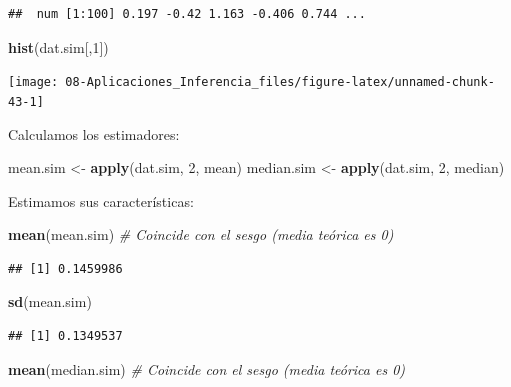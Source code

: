 \documentclass[
]{book}
\newenvironment{Shaded}{\begin{snugshade}}{\end{snugshade}}
\newcommand{\CommentTok}[1]{\textcolor[rgb]{0.56,0.35,0.01}{\textit{#1}}}
\newcommand{\DecValTok}[1]{\textcolor[rgb]{0.00,0.00,0.81}{#1}}
\newcommand{\KeywordTok}[1]{\textcolor[rgb]{0.13,0.29,0.53}{\textbf{#1}}}
\newcommand{\NormalTok}[1]{#1}
\newcommand{\StringTok}[1]{\textcolor[rgb]{0.31,0.60,0.02}{#1}}
\theoremstyle{break}
\theoremstyle{definition}
\theoremstyle{definition}
\theoremstyle{definition}
\theoremstyle{remark}
\begin{document}
\begin{enumerate}
\begin{verbatim}
##  num [1:100] 0.197 -0.42 1.163 -0.406 0.744 ...
\end{verbatim}

\begin{Shaded}
\begin{Highlighting}[]
\KeywordTok{hist}\NormalTok{(dat.sim[,}\DecValTok{1}\NormalTok{])}
\end{Highlighting}
\end{Shaded}

  \begin{center}\texttt{[image: 08-Aplicaciones\_Inferencia\_files/figure-latex/unnamed-chunk-43-1]} \end{center}

  Calculamos los estimadores:

\begin{Shaded}
\begin{Highlighting}[]
\NormalTok{mean.sim <-}\StringTok{ }\KeywordTok{apply}\NormalTok{(dat.sim, }\DecValTok{2}\NormalTok{, mean)}
\NormalTok{median.sim <-}\StringTok{ }\KeywordTok{apply}\NormalTok{(dat.sim, }\DecValTok{2}\NormalTok{, median)}
\end{Highlighting}
\end{Shaded}

  Estimamos sus características:

\begin{Shaded}
\begin{Highlighting}[]
\KeywordTok{mean}\NormalTok{(mean.sim) }\CommentTok{# Coincide con el sesgo (media teórica es 0)}
\end{Highlighting}
\end{Shaded}

\begin{verbatim}
## [1] 0.1459986
\end{verbatim}

\begin{Shaded}
\begin{Highlighting}[]
\KeywordTok{sd}\NormalTok{(mean.sim)}
\end{Highlighting}
\end{Shaded}

\begin{verbatim}
## [1] 0.1349537
\end{verbatim}

\begin{Shaded}
\begin{Highlighting}[]
\KeywordTok{mean}\NormalTok{(median.sim) }\CommentTok{# Coincide con el sesgo (media teórica es 0)}
\end{Highlighting}
\end{Shaded}


\end{enumerate}
\end{document}

